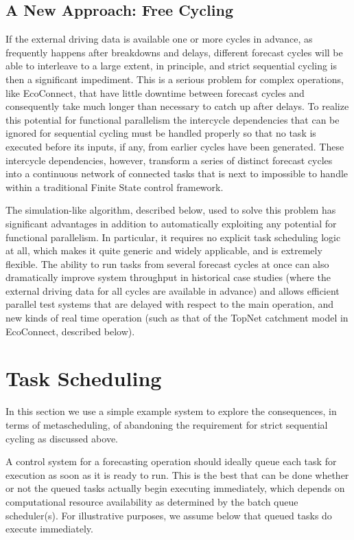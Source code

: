 \documentclass[11pt,a4paper]{article}
\begin{document}
\subsection{A New Approach: Free Cycling}

If the external driving data is available one or more cycles in advance,
as frequently happens after breakdowns and delays, different forecast
cycles will be able to interleave to a large extent, in principle, and
strict sequential cycling is then a significant impediment. This is a
serious problem for complex operations, like EcoConnect, that have
little downtime between forecast cycles and consequently take much
longer than necessary to catch up after delays. To realize this
potential for functional parallelism the intercycle dependencies that
can be ignored for sequential cycling must be handled properly so that
no task is executed before its inputs, if any, from earlier cycles have
been generated. These intercycle dependencies, however, transform a
series of distinct forecast cycles into a continuous network of
connected tasks that is next to impossible to handle within a
traditional Finite State control framework. 

The simulation-like algorithm, described below, used to solve this
problem has significant advantages in addition to automatically
exploiting any potential for functional parallelism. In particular, it
requires no explicit task scheduling logic at all, which makes it quite
generic and widely applicable, and is extremely flexible. The ability to
run tasks from several forecast cycles at once can also dramatically
improve system throughput in historical case studies (where the external
driving data for all cycles are available in advance) and allows
efficient parallel test systems that are delayed with respect to the
main operation, and new kinds of real time operation (such as that of
the TopNet catchment model in EcoConnect, described below). 


\section{Task Scheduling}

In this section we use a simple example system to explore the
consequences, in terms of metascheduling, of abandoning the requirement
for strict sequential cycling as discussed above.

A control system for a forecasting operation should ideally queue each
task for execution as soon as it is ready to run. This is the best that
can be done whether or not the queued tasks actually begin executing
immediately, which depends on computational resource availability as
determined by the batch queue scheduler(s). For illustrative purposes,
we assume below that queued tasks do execute immediately. 
\end{document}
